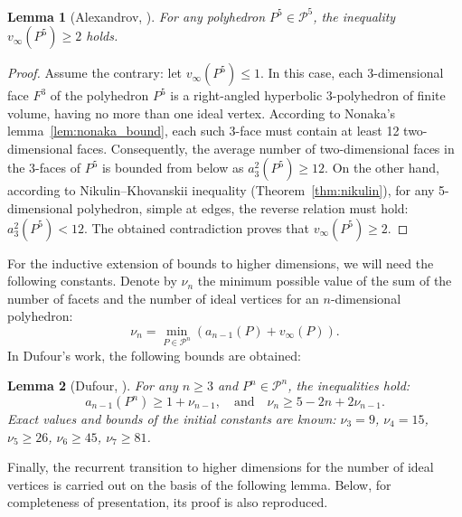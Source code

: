 \documentclass[12pt]{amsart}
\newtheorem{lemma}{Lemma}[section]
\theoremstyle{definition}
\begin{document}
	\begin{lemma}[Alexandrov, \cite{Ale23}] \label{lem:alex_base}
		For any polyhedron $P^5 \in \mathcal{P}^5$, the inequality $v_\infty(P^5) \ge 2$ holds.
	\end{lemma}
	\begin{proof}
		Assume the contrary: let $v_\infty(P^5) \le 1$. In this case, each 3-dimensional face $F^3$ of the polyhedron $P^5$ is a right-angled hyperbolic 3-polyhedron of finite volume, having no more than one ideal vertex. According to Nonaka's lemma~\ref{lem:nonaka_bound}, each such 3-face must contain at least 12 two-dimensional faces. Consequently, the average number of two-dimensional faces in the 3-faces of $P^5$ is bounded from below as $a_3^2(P^5) \ge 12$. On the other hand, according to Nikulin--Khovanskii inequality (Theorem~\ref{thm:nikulin}), for any 5-dimensional polyhedron, simple at edges, the reverse relation must hold: $a_3^2(P^5) < 12$. The obtained contradiction proves that $v_\infty(P^5) \ge 2$.
	\end{proof}
	
	For the inductive extension of bounds to higher dimensions, we will need the following constants. Denote by $\nu_n$ the minimum possible value of the sum of the number of facets and the number of ideal vertices for an $n$-dimensional polyhedron: $$\nu_n = \min_{P \in \mathcal{P}^n} (a_{n-1}(P) + v_\infty(P)).$$ In Dufour's work, the following bounds are obtained:
	
	\begin{lemma}[Dufour, \cite{Dufour2010}] \label{lem:dufour_recurrence}
		For any $n \ge 3$ and $P^n \in \mathcal{P}^n$, the inequalities hold:
		\begin{equation}
			a_{n-1}(P^n) \ge 1 + \nu_{n-1}, \quad \text{and} \quad \nu_n \ge 5 - 2n + 2\nu_{n-1}.
		\end{equation}
		Exact values and bounds of the initial constants are known: $\nu_3 = 9$, $\nu_4 = 15$, $\nu_5 \ge 26$, $\nu_6 \ge 45$, $\nu_7 \ge 81$.
	\end{lemma}
	
	Finally, the recurrent transition to higher dimensions for the number of ideal vertices is carried out on the basis of the following lemma. Below, for completeness of presentation, its proof is also reproduced.
	
\end{document}
